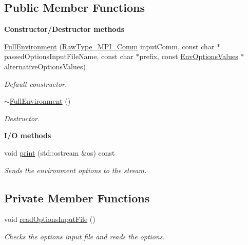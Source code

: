 \subsection*{Public Member Functions}
\begin{Indent}{\bf Constructor/\-Destructor methods}\par
\begin{DoxyCompactItemize}
\item 
\hyperlink{class_q_u_e_s_o_1_1_full_environment_a4d4f12be6e7dd34ce5f1f5e5931526eb}{Full\-Environment} (\hyperlink{namespace_q_u_e_s_o_af48741a7e6d7897e9e96e0f5bb26cfd7}{Raw\-Type\-\_\-\-M\-P\-I\-\_\-\-Comm} input\-Comm, const char $\ast$passed\-Options\-Input\-File\-Name, const char $\ast$prefix, const \hyperlink{class_q_u_e_s_o_1_1_env_options_values}{Env\-Options\-Values} $\ast$alternative\-Options\-Values)
\begin{DoxyCompactList}\small\item\em Default constructor. \end{DoxyCompactList}\item 
\hyperlink{class_q_u_e_s_o_1_1_full_environment_a664220a7e2b32242f3d58bfe51d316d1}{$\sim$\-Full\-Environment} ()
\begin{DoxyCompactList}\small\item\em Destructor. \end{DoxyCompactList}\end{DoxyCompactItemize}
\end{Indent}
\begin{Indent}{\bf I/\-O methods}\par
\begin{DoxyCompactItemize}
\item 
void \hyperlink{class_q_u_e_s_o_1_1_full_environment_a3433b6293fc094095aca2e5ebce5a099}{print} (std\-::ostream \&os) const 
\begin{DoxyCompactList}\small\item\em Sends the environment options to the stream. \end{DoxyCompactList}\end{DoxyCompactItemize}
\end{Indent}
\subsection*{Private Member Functions}
\begin{DoxyCompactItemize}
\item 
void \hyperlink{class_q_u_e_s_o_1_1_full_environment_a41eadd931012db5a422f5ec13adb7816}{read\-Options\-Input\-File} ()
\begin{DoxyCompactList}\small\item\em Checks the options input file and reads the options. \end{DoxyCompactList}\end{DoxyCompactItemize}
